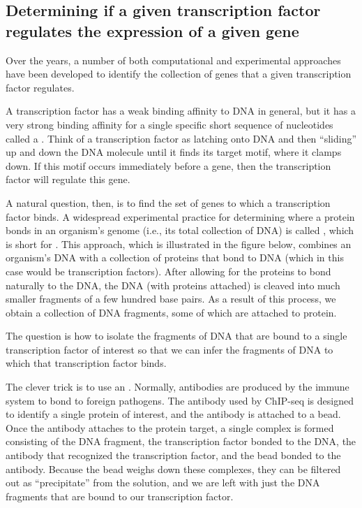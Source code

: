\FloatBarrier
{}
\subsection{Determining if a given transcription factor regulates the expression of a given gene}

Over the years, a number of both computational and experimental approaches have been developed to identify the collection of genes that a given transcription factor regulates.

A transcription factor has a weak binding affinity to DNA in general, but it has a very strong binding affinity for a single specific short sequence of nucleotides called a . Think of a transcription factor as latching onto DNA and then ``sliding'' up and down the DNA molecule until it finds its target motif, where it clamps down. If this motif occurs immediately before a gene, then the transcription factor will regulate this gene.

A natural question, then, is to find the set of genes to which a transcription factor binds. A widespread experimental practice for determining where a protein bonds in an organism's genome (i.e., its total collection of DNA) is called , which is short for . This approach, which is illustrated in the figure below, combines an organism's DNA with a collection of proteins that bond to DNA (which in this case would be transcription factors). After allowing for the proteins to bond naturally to the DNA, the DNA (with proteins attached) is cleaved into much smaller fragments of a few hundred base pairs. As a result of this process, we obtain a collection of DNA fragments, some of which are attached to protein.

The question is how to isolate the fragments of DNA that are bound to a single transcription factor of interest so that we can infer the fragments of DNA to which that transcription factor binds.

The clever trick is to use an . Normally, antibodies are produced by the immune system to bond to foreign pathogens. The antibody used by ChIP-seq is designed to identify a single protein of interest, and the antibody is attached to a bead. Once the antibody attaches to the protein target, a single complex is formed consisting of the DNA fragment, the transcription factor bonded to the DNA, the antibody that recognized the transcription factor, and the bead bonded to the antibody. Because the bead weighs down these complexes, they can be filtered out as ``precipitate'' from the solution, and we are left with just the DNA fragments that are bound to our transcription factor.

